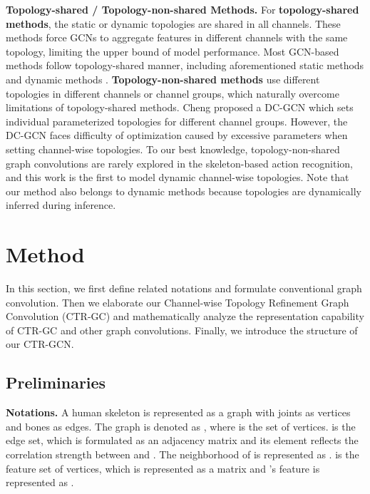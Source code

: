 \documentclass[10pt,twocolumn,letterpaper]{article}
\begin{document}
\noindent \textbf{Topology-shared / Topology-non-shared Methods.} For \textbf{topology-shared methods}, the static or dynamic topologies are shared in all channels. These methods force GCNs to aggregate features in different channels with the same topology, limiting the upper bound of model performance. Most GCN-based methods follow topology-shared manner, including aforementioned static methods \cite{huang2020spatio,liu2020disentangling,yan2018spatial} and dynamic methods \cite{li2019actional,shi2019two,ye2020dynamic,zhang2020semantics}. \textbf{Topology-non-shared methods} use different topologies in different channels or channel groups, which naturally overcome limitations of topology-shared methods. Cheng \etal \cite{cheng2020eccv} proposed a DC-GCN which sets individual parameterized topologies for different channel groups. However, the DC-GCN faces difficulty of optimization caused by excessive parameters when setting channel-wise topologies. To our best knowledge, topology-non-shared graph convolutions are rarely explored in the skeleton-based action recognition, and this work is the first to model dynamic channel-wise topologies. Note that our method also belongs to dynamic methods because topologies are dynamically inferred during inference.




\section{Method}
In this section, we first define related notations and formulate conventional graph convolution. Then we elaborate our Channel-wise Topology Refinement Graph Convolution (CTR-GC) and mathematically analyze the representation capability of CTR-GC and other graph convolutions. Finally, we introduce the structure of our CTR-GCN.

\subsection{Preliminaries}
\noindent \textbf{Notations.} A human skeleton is represented as a graph with joints as vertices and bones as edges. The graph is denoted as , where  is the set of  vertices.  is the edge set, which is formulated as an adjacency matrix  and its element  reflects the correlation strength between  and . The neighborhood of  is represented as .  is the feature set of  vertices, which is represented as a matrix  and 's feature is represented as . 
\end{document}
